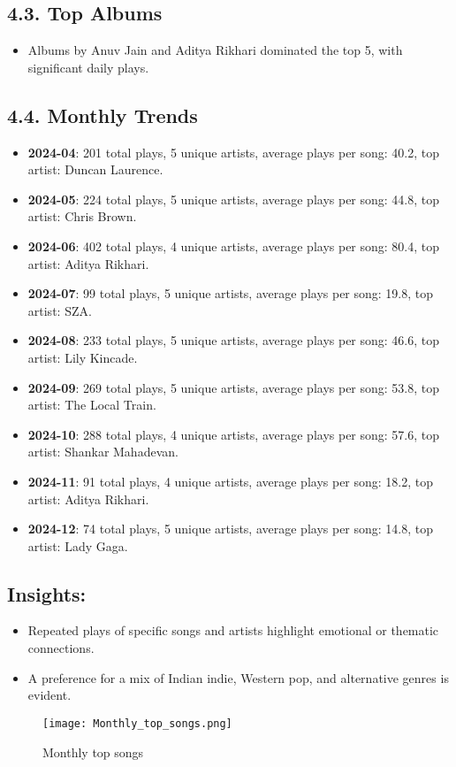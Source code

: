 \documentclass[12pt]{article}
\begin{document}
\begin{itemize}
\subsection*{4.3. Top Albums}
\begin{itemize}
    \item Albums by Anuv Jain and Aditya Rikhari dominated the top 5, with significant daily plays.
\end{itemize}

\subsection*{4.4. Monthly Trends}
\begin{itemize}
    \item \textbf{2024-04}: 201 total plays, 5 unique artists, average plays per song: 40.2, top artist: Duncan Laurence.
    \item \textbf{2024-05}: 224 total plays, 5 unique artists, average plays per song: 44.8, top artist: Chris Brown.
    \item \textbf{2024-06}: 402 total plays, 4 unique artists, average plays per song: 80.4, top artist: Aditya Rikhari.
    \item \textbf{2024-07}: 99 total plays, 5 unique artists, average plays per song: 19.8, top artist: SZA.
    \item \textbf{2024-08}: 233 total plays, 5 unique artists, average plays per song: 46.6, top artist: Lily Kincade.
    \item \textbf{2024-09}: 269 total plays, 5 unique artists, average plays per song: 53.8, top artist: The Local Train.
    \item \textbf{2024-10}: 288 total plays, 4 unique artists, average plays per song: 57.6, top artist: Shankar Mahadevan.
    \item \textbf{2024-11}: 91 total plays, 4 unique artists, average plays per song: 18.2, top artist: Aditya Rikhari.
    \item \textbf{2024-12}: 74 total plays, 5 unique artists, average plays per song: 14.8, top artist: Lady Gaga.
\end{itemize}
\subsection*{Insights:}
\begin{itemize}
    \item Repeated plays of specific songs and artists highlight emotional or thematic connections.
    \item A preference for a mix of Indian indie, Western pop, and alternative genres is evident.
\end{itemize}
\begin{figure}
    \centering
    \texttt{[image: Monthly\_top\_songs.png]}
    \caption{Monthly top songs}
    \label{fig:enter-label}
\end{figure}

\end{itemize}
\end{document}
